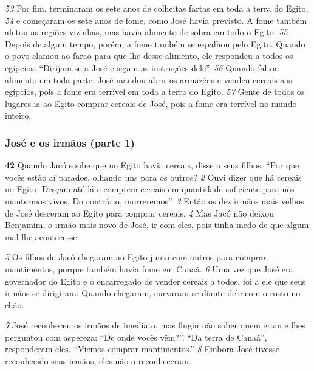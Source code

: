 \bigskip   
\textit{\tiny 53}
Por fim, terminaram os sete anos de colheitas fartas em toda a terra do Egito,
\textit{\tiny 54}
e começaram os sete anos de fome, como José havia previsto. A fome também
afetou as regiões vizinhas, mas havia alimento de sobra em todo o Egito. 
\textit{\tiny 55}
Depois
de algum tempo, porém, a fome também se espalhou pelo Egito. Quando o povo
clamou ao faraó para que lhe desse alimento, ele respondeu a todos os egípcios:
“Dirijam-se a José e sigam as instruções dele”. 
\textit{\tiny 56}
Quando faltou alimento em toda
parte, José mandou abrir os armazéns e vendeu cereais aos egípcios, pois a fome
era terrível em toda a terra do Egito. 
\textit{\tiny 57}
Gente de todos os lugares ia ao Egito
comprar cereais de José, pois a fome era terrível no mundo inteiro.

\bigskip   
\subsubsection*{José e os irmãos (parte 1)}
\textbf{\large 42}
 Quando Jacó soube que no Egito havia cereais, disse a seus filhos: “Por que
vocês estão aí parados, olhando uns para os outros? 
\textit{\tiny 2} 
Ouvi dizer que há cereais no
Egito. Desçam até lá e comprem cereais em quantidade suficiente para nos
mantermos vivos. Do contrário, morreremos”. 
\textit{\tiny 3}
Então os dez irmãos mais velhos de José desceram ao Egito para comprar
cereais. 
\textit{\tiny 4} 
Mas Jacó não deixou Benjamim, o irmão mais novo de José, ir com eles,
pois tinha medo de que algum mal lhe acontecesse. 

\bigskip   
\textit{\tiny 5} 
Os filhos de Jacó
chegaram ao Egito junto com outros para comprar mantimentos, porque também
havia fome em Canaã. 
\textit{\tiny 6}
Uma vez que José era governador do Egito e o encarregado de vender cereais a
todos, foi a ele que seus irmãos se dirigiram. Quando chegaram, curvaram-se
diante dele com o rosto no chão. 

\bigskip   
\textit{\tiny 7} 
José reconheceu os irmãos de imediato, mas
fingiu não saber quem eram e lhes perguntou com aspereza: “De onde vocês
vêm?”.
   “Da terra de Canaã”, responderam eles. “Viemos comprar mantimentos.” 
\textit{\tiny 8}
Embora José tivesse reconhecido seus irmãos, eles não o reconheceram. 

